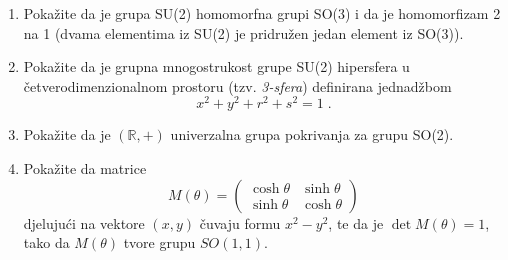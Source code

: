 \begin{enumerate}[label=\arabic{chapter}.\arabic*.]
\item Pokažite da je grupa SU(2) homomorfna grupi SO(3) i da je homomorfizam
       2 na 1 (dvama elementima iz SU(2) je pridružen jedan element iz SO(3)).

\item Pokažite da je grupna mnogostrukost grupe SU(2) hipersfera u
 četverodimenzionalnom prostoru (tzv. \emph{3-sfera}) definirana
 jednadžbom 
\begin{displaymath}
x^2+y^2+r^2+s^2=1 \;.
\end{displaymath}

\item Pokažite da je $(\mathbb{R}, +)$ 
 univerzalna grupa pokrivanja za grupu SO(2).

\item Pokažite da matrice
\begin{equation}
 M(\theta) = \begin{pmatrix}
\cosh\theta & \sinh\theta  \\
\sinh\theta & \cosh\theta
\end{pmatrix}
\end{equation}
djelujući na vektore $(x, y)$ čuvaju formu $x^2 - y^2$, te da 
je $\det M(\theta) = 1$, tako da $M(\theta)$ tvore grupu
$SO(1,1)$.
\end{enumerate}
